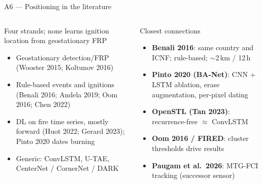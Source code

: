 \documentclass[10pt,aspectratio=169]{beamer}
\begin{document}
\begin{frame}{A6 --- Positioning in the literature}
  \small
  \begin{columns}[T]
    \begin{block}{Four strands; none learns ignition location from geostationary FRP}
      \footnotesize
      \begin{itemize}
        \item Geostationary detection/FRP (Wooster 2015; Koltunov 2016)
        \item Rule-based events and ignitions (Benali 2016; Andela 2019; Oom 2016; Chen 2022)
        \item DL on fire time series, mostly forward (Huot 2022; Gerard 2023); Pinto 2020 dates burning
        \item Generic: ConvLSTM, U-TAE, CenterNet / CornerNet / DARK
      \end{itemize}
    \end{block}
    \begin{block}{Closest connections}
      \footnotesize
      \begin{itemize}
        \item \textbf{Benali 2016}: same country and ICNF; rule-based; $\sim$2\,km / 12\,h
        \item \textbf{Pinto 2020 (BA-Net)}: CNN + LSTM ablation, erase augmentation, per-pixel dating
        \item \textbf{OpenSTL (Tan 2023)}: recurrence-free $\approx$ ConvLSTM
        \item \textbf{Oom 2016 / FIRED}: cluster thresholds drive results
        \item \textbf{Paugam et al.\ 2026}: MTG-FCI tracking (successor sensor)
      \end{itemize}
    \end{block}
  \end{columns}
\end{frame}
\end{document}
